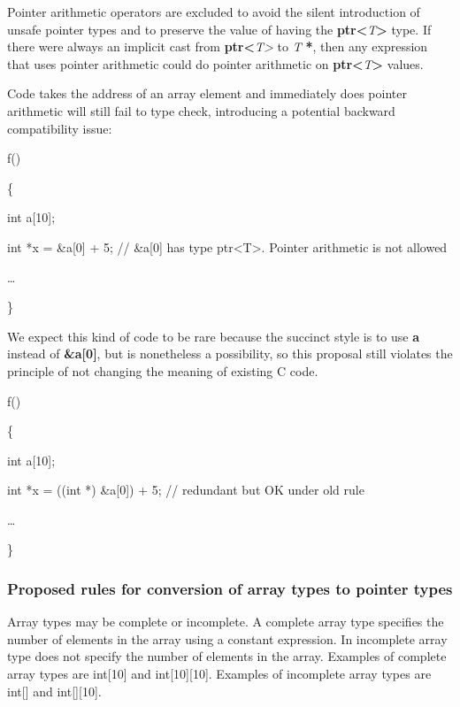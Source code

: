 \documentclass[]{article}
\begin{document}
Pointer arithmetic operators are excluded to avoid the silent
introduction of unsafe pointer types and to preserve the value of having
the \textbf{ptr\textless{}}\emph{T}\textbf{\textgreater{}} type. If
there were always an implicit cast from
\textbf{ptr\textless{}}\emph{T\textgreater{}} to \emph{T} \textbf{*},
then any expression that uses pointer arithmetic could do pointer
arithmetic on \textbf{ptr\textless{}}\emph{T}\textbf{\textgreater{}}
values.

Code takes the address of an array element and immediately does pointer
arithmetic will still fail to type check, introducing a potential
backward compatibility issue:

f()

\{

int a{[}10{]};

int *x = \&a{[}0{]} + 5; // \&a{[}0{]} has type
ptr\textless{}T\textgreater{}. Pointer arithmetic is not allowed

\ldots{}

\}

We expect this kind of code to be rare because the succinct style is to
use \textbf{a} instead of \textbf{\&a{[}0{]}}, but is nonetheless a
possibility, so this proposal still violates the principle of not
changing the meaning of existing C code.

f()

\{

int a{[}10{]};

int *x = ((int *) \&a{[}0{]}) + 5; // redundant but OK under old rule

\ldots{}

\}

\subsubsection{\texorpdfstring{\protect\hypertarget{ux5fToc422907011}{}{\protect\hypertarget{ux5fToc424307740}{}{\protect\hypertarget{ux5fToc426641143}{}{\protect\hypertarget{ux5fToc435435018}{}{\protect\hypertarget{ux5fToc437460853}{}{\protect\hypertarget{ux5fToc440445534}{}{\protect\hypertarget{ux5fToc440449316}{}{\protect\hypertarget{ux5fToc440551966}{}{}}}}}}}}Proposed
rules for conversion of array types to pointer
types}{Proposed rules for conversion of array types to pointer types}}\label{proposed-rules-for-conversion-of-array-types-to-pointer-types}

Array types may be complete or incomplete. A complete array type
specifies the number of elements in the array using a constant
expression. In incomplete array type does not specify the number of
elements in the array. Examples of complete array types are int{[}10{]}
and int{[}10{]}{[}10{]}. Examples of incomplete array types are
int{[}{]} and int{[}{]}{[}10{]}.
\end{document}

